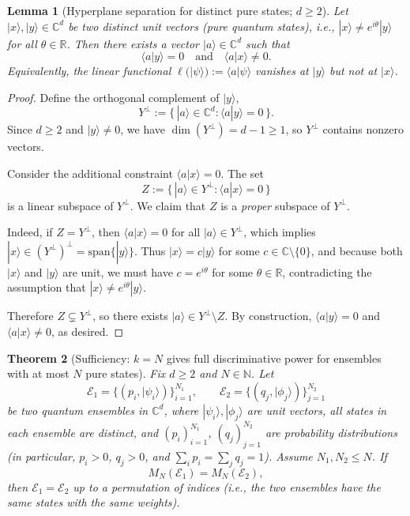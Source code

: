 \documentclass[aps,prx,reprint,superscriptaddress,amsmath,amssymb,longbibliography,floatfix]{revtex4-2}
\providecommand{\ket}[1]{|#1 \rangle}
\providecommand{\braket}[2]{\langle #1|#2 \rangle}
\theoremstyle{plain}
\newtheorem{theorem}{Theorem}[section]
\newtheorem{lemma}[theorem]{Lemma}
\theoremstyle{definition}
\theoremstyle{remark}
\begin{document}
\begin{lemma}[Hyperplane separation for distinct pure states; $d\ge 2$]
Let $\ket{x},\ket{y}\in\mathbb C^d$ be two distinct unit vectors (pure quantum states), i.e.,
$\ket{x}\neq e^{i\theta}\ket{y}$ for all $\theta\in\mathbb R$. Then there exists a vector $\ket{a}\in\mathbb C^d$
such that
\begin{equation}
\braket{a}{y}=0
\quad\text{and}\quad
\braket{a}{x}\neq 0.
\label{eq:app-hyperplane-separation}
\end{equation}
Equivalently, the linear functional $\ell(\ket{\psi}) := \braket{a}{\psi}$ vanishes at $\ket{y}$ but not at $\ket{x}$. \label{lemma: hyperplane}
\end{lemma}

\begin{proof}
Define the orthogonal complement of $\ket{y}$,
\[
Y^\perp := \bigl\{\,\ket{a}\in\mathbb C^d : \braket{a}{y}=0\,\bigr\}.
\]
Since $d\ge 2$ and $\ket{y}\neq 0$, we have $\dim(Y^\perp)=d-1\ge 1$, so $Y^\perp$ contains nonzero vectors.

Consider the additional constraint $\braket{a}{x}=0$. The set
\[
Z := \bigl\{\,\ket{a}\in Y^\perp : \braket{a}{x}=0\,\bigr\}
\]
is a linear subspace of $Y^\perp$. We claim that $Z$ is a \emph{proper} subspace of $Y^\perp$.

Indeed, if $Z=Y^\perp$, then $\braket{a}{x}=0$ for all $\ket{a}\in Y^\perp$, which implies
$\ket{x}\in (Y^\perp)^\perp = \mathrm{span}\{\ket{y}\}$.
Thus $\ket{x}=c\ket{y}$ for some $c\in\mathbb C\setminus\{0\}$, and because both $\ket{x}$ and $\ket{y}$ are unit,
we must have $c=e^{i\theta}$ for some $\theta\in\mathbb R$, contradicting the assumption that
$\ket{x}\neq e^{i\theta}\ket{y}$.

Therefore $Z\subsetneq Y^\perp$, so there exists $\ket{a}\in Y^\perp\setminus Z$.
By construction, $\braket{a}{y}=0$ and $\braket{a}{x}\neq 0$, as desired.
\end{proof}


\begin{theorem}[Sufficiency: $k=N$ gives full discriminative power for ensembles with at most $N$ pure states]
Fix $d\ge 2$ and $N\in\mathbb N$.
Let
\[
\mathcal E_1=\{(p_i,\ket{\psi_i})\}_{i=1}^{N_1},
\qquad
\mathcal E_2=\{(q_j,\ket{\phi_j})\}_{j=1}^{N_2}
\]
be two quantum ensembles in $\mathbb C^d$, where $\ket{\psi_i},\ket{\phi_j}$ are unit vectors, all states in each
ensemble are distinct, and $(p_i)_{i=1}^{N_1}$, $(q_j)_{j=1}^{N_2}$ are probability distributions (in particular,
$p_i>0$, $q_j>0$, and $\sum_i p_i=\sum_j q_j=1$). Assume $N_1,N_2\le N$.
If
\[
M_N(\mathcal E_1)=M_N(\mathcal E_2),
\]
then $\mathcal E_1=\mathcal E_2$ up to a permutation of indices (i.e., the two ensembles have the same states with
the same weights).\label{thm: k=N full discriminative power}
\end{theorem}
\end{document}
